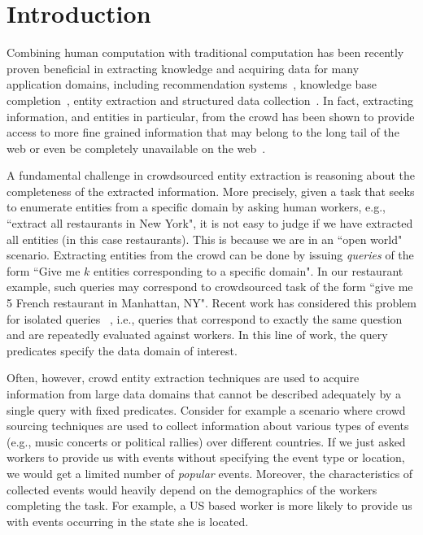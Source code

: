 \documentclass{vldb}
\begin{document}
\section{Introduction}
\label{sec:intro}
Combining human computation with traditional computation has been recently proven beneficial in extracting knowledge and acquiring data for many application domains, including recommendation systems~\cite{amsterdamer:2014}, knowledge base completion~\cite{kondredi:2014}, entity extraction and structured data collection~\cite{trushkowsky:2013, park:2014}. In fact, extracting information, and entities in particular, from the crowd has been shown to provide access to more fine grained information that may belong to the long tail of the web or even be completely unavailable on the web~\cite{west:2014}.

A fundamental challenge in crowdsourced entity extraction is reasoning about the completeness of the extracted information. More precisely, given a task that seeks to enumerate entities from a specific domain by asking human workers, e.g., ``extract all restaurants in New York", it is not easy to judge if we have extracted all entities (in this case restaurants). This is because we are in an ``open world"~\cite{trushkowsky:2013} scenario. Extracting entities from the crowd can be done by issuing {\em queries} of the form ``Give me $k$ entities corresponding to a specific domain". In our restaurant example, such queries may correspond to crowdsourced task of the form ``give me 5 French restaurant in Manhattan, NY". Recent work has considered this problem for isolated queries~\cite{trushkowsky:2013} , i.e., queries that correspond to exactly the same question and are repeatedly evaluated against workers. In this line of work, the query predicates specify the data domain of interest. 

Often, however, crowd entity extraction techniques are used to acquire information from large data domains that cannot be described adequately by a single query with fixed predicates. Consider for example a scenario where crowd sourcing techniques are used to collect information about various types of events (e.g., music concerts or political rallies) over different countries. If we just asked workers to provide us with events without specifying the event type or location, we would get a limited number of {\em popular} events. Moreover, the characteristics of collected events would heavily depend on the demographics of the workers completing the task. For example, a US based worker is more likely to provide us with events occurring in the state she is located. 
\end{document}
